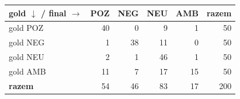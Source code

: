 \begin{tabular}{lrrrrr}
\toprule
gold $\downarrow$ / final $\rightarrow$ & POZ & NEG & NEU & AMB & razem \\
\midrule
gold POZ & 40 & 0 & 9 & 1 & 50 \\
gold NEG & 1 & 38 & 11 & 0 & 50 \\
gold NEU & 2 & 1 & 46 & 1 & 50 \\
gold AMB & 11 & 7 & 17 & 15 & 50 \\
\midrule
\textbf{razem} & 54 & 46 & 83 & 17 & 200 \\
\bottomrule
\end{tabular}
